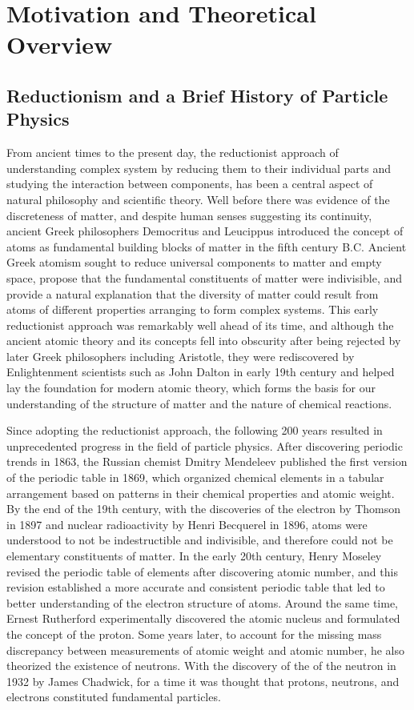 
\chapter{Motivation and Theoretical Overview}

\section{Reductionism and a Brief History of Particle Physics}
From ancient times to the present day, the reductionist approach of understanding complex system by reducing them to their individual parts and studying the interaction between components, has been a central aspect of natural philosophy and scientific theory.
Well before there was evidence of the discreteness of matter, and despite human senses suggesting its continuity, ancient Greek philosophers Democritus and Leucippus introduced the concept of atoms as fundamental building blocks of matter in the fifth century B.C.
Ancient Greek atomism sought to reduce universal components to matter and empty space, propose that the fundamental constituents of matter were indivisible, and provide a natural explanation that the diversity of matter could result from atoms of different properties arranging to form complex systems.
This early reductionist approach was remarkably well ahead of its time, and although the ancient atomic theory and its concepts fell into obscurity after being rejected by later Greek philosophers including Aristotle, they were rediscovered by Enlightenment scientists such as John Dalton in early 19th century and helped lay the foundation for modern atomic theory, which forms the basis for our understanding of the structure of matter and the nature of chemical reactions.

Since adopting the reductionist approach, the following 200 years resulted in unprecedented progress in the field of particle physics.
After discovering periodic trends in 1863, the Russian chemist Dmitry Mendeleev published the first version of the periodic table in 1869, which organized chemical elements in a tabular arrangement based on patterns in their chemical properties and atomic weight.
By the end of the 19th century, with the discoveries of the electron by Thomson in 1897 and nuclear radioactivity by Henri Becquerel in 1896, atoms were understood to not be indestructible and indivisible, and therefore could not be elementary constituents of matter.
In the early 20th century, Henry Moseley revised the periodic table of elements after discovering atomic number, and this revision established a more accurate and consistent periodic table that led to better understanding of the electron structure of atoms.
Around the same time, Ernest Rutherford experimentally discovered the atomic nucleus and formulated the concept of the proton.
Some years later, to account for the missing mass discrepancy between measurements of atomic weight and atomic number, he also theorized the existence of neutrons.
With the discovery of the of the neutron in 1932 by James Chadwick, for a time it was thought that protons, neutrons, and electrons constituted fundamental particles.

